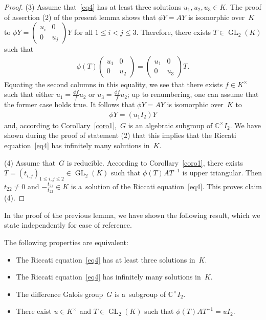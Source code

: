 \begin{proof}
(3) Assume that~\eqref{eq4} has at least three solutions $u_{1},u_{2},u_{3}\in K$.
The proof of assertion (2) of the present lemma shows that $\phi Y=AY$ is isomorphic over~$K$ to $\phi Y=
\begin{pmatrix}
u_{i}&0
\\
0&u_{j}
\end{pmatrix}
Y$ for all $1\leq i<j \leq 3$.
Therefore, there exists $T \in \operatorname{GL}_{2}(K)$ such that
\begin{gather*}
\phi(T)
\begin{pmatrix}
u_{1}&0
\\
0&u_{2}
\end{pmatrix}
=
\begin{pmatrix}
u_{1}&0
\\
0&u_{3}
\end{pmatrix}
T.
\end{gather*}
Equating the second columns in this equality, we see that there exists ${f\in K^{\times}}$ such that either
$u_{1}=\frac{\phi f}{f}u_{2}$ or $u_{3}=\frac{\phi f}{f}u_{2}$; up to renumbering, one can assume that the former case
holds true.
It follows that $\phi Y=AY$ is isomorphic over~$K$ to
\begin{gather*}
\phi Y=(u_{1} I_{2}) Y
\end{gather*}
and, according to Corollary~\ref{coro1},~$G$ is an algebraic subgroup of $\mathbb C^{\times} I_{2}$.
We have shown during the proof of statement (2) that this implies that the Riccati equation~\eqref{eq4} has inf\/initely
many solutions in~$K$.

(4) Assume that~$G$ is reducible.
According to Corollary~\ref{coro1}, there exists $T=(t_{i,j})_{1 \leq i,j\leq 2}\in \operatorname{GL}_{2}(K)$ such that
$\phi(T)AT^{-1}$ is upper triangular.
Then $t_{22}\neq 0$ and $-\frac{t_{21}}{t_{22}}\in K$ is a~solution of the Riccati equation~\eqref{eq4}.
This proves claim (4).
\end{proof}

In the proof of the previous lemma, we have shown the following result, which we state independently for ease of
reference.

\begin{Lemma}
\label{lem ric irred bis}
The following properties are equivalent:
\begin{itemize}\itemsep=0pt
\item The Riccati equation~\eqref{eq4} has at least three solutions in~$K$.
\item The Riccati equation~\eqref{eq4} has infinitely many solutions in~$K$.
\item The difference Galois group~$G$ is a~subgroup of $\mathbb C^{\times}I_{2}$.
\item There exist $u \in K^{\times}$ and $T \in \operatorname{GL}_2(K)$ such that $\phi(T)AT^{-1} = u I_{2}$.
\end{itemize}
\end{Lemma}

